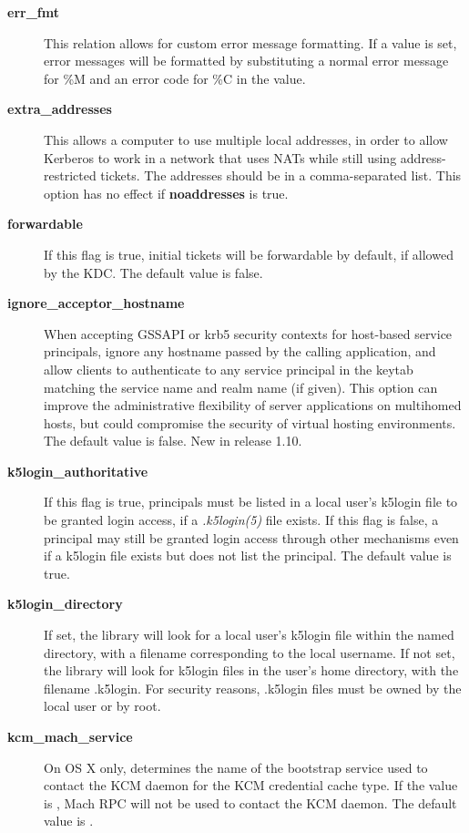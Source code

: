 \documentclass[letterpaper,10pt,english]{sphinxmanual}
\begin{document}
\begin{description}
\item[{\textbf{err\_fmt}}] \leavevmode
This relation allows for custom error message formatting.  If a
value is set, error messages will be formatted by substituting a
normal error message for \%M and an error code for \%C in the value.

\item[{\textbf{extra\_addresses}}] \leavevmode
This allows a computer to use multiple local addresses, in order
to allow Kerberos to work in a network that uses NATs while still
using address-restricted tickets.  The addresses should be in a
comma-separated list.  This option has no effect if
\textbf{noaddresses} is true.

\item[{\textbf{forwardable}}] \leavevmode
If this flag is true, initial tickets will be forwardable by
default, if allowed by the KDC.  The default value is false.

\item[{\textbf{ignore\_acceptor\_hostname}}] \leavevmode
When accepting GSSAPI or krb5 security contexts for host-based
service principals, ignore any hostname passed by the calling
application, and allow clients to authenticate to any service
principal in the keytab matching the service name and realm name
(if given).  This option can improve the administrative
flexibility of server applications on multihomed hosts, but could
compromise the security of virtual hosting environments.  The
default value is false.  New in release 1.10.

\item[{\textbf{k5login\_authoritative}}] \leavevmode
If this flag is true, principals must be listed in a local user's
k5login file to be granted login access, if a \emph{.k5login(5)}
file exists.  If this flag is false, a principal may still be
granted login access through other mechanisms even if a k5login
file exists but does not list the principal.  The default value is
true.

\item[{\textbf{k5login\_directory}}] \leavevmode
If set, the library will look for a local user's k5login file
within the named directory, with a filename corresponding to the
local username.  If not set, the library will look for k5login
files in the user's home directory, with the filename .k5login.
For security reasons, .k5login files must be owned by
the local user or by root.

\item[{\textbf{kcm\_mach\_service}}] \leavevmode
On OS X only, determines the name of the bootstrap service used to
contact the KCM daemon for the KCM credential cache type.  If the
value is \code{-}, Mach RPC will not be used to contact the KCM
daemon.  The default value is .


\end{description}
\end{document}
